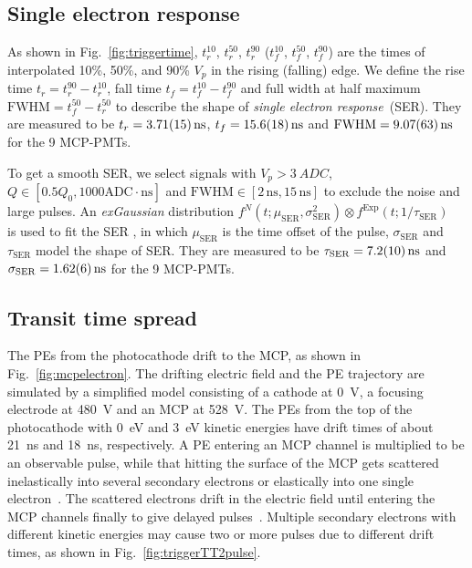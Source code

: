 \subsection{Single electron response}
\label{sec:SER}
As shown in Fig.~\ref{fig:triggertime}, $t^{10}_r$, $t^{50}_r$, $t^{90}_r$ ($t^{10}_f$, $t^{50}_f$, $t^{90}_f$) are the times of interpolated 10\%, 50\%, and 90\% $V_p$ in the rising (falling) edge. We define the rise time $t_r = t^{90}_r - t^{10}_r$, fall time $t_f = t^{10}_f - t^{90}_f$ and full width at half maximum $\mathrm{FWHM} = t^{50}_f - t^{50}_r$ to describe the shape of \emph{single electron response}~(SER).  They are measured to be $t_r = \SI{3.71\pm0.15}{ns}$, $t_f = \SI{15.6\pm1.8}{ns}$ and $\mathrm{FWHM} = \SI{9.07\pm0.63}{ns}$ for the 9 MCP-PMTs.

To get a smooth SER, we select signals with $V_p>\SI{3}{ADC}$, $Q \in [0.5Q_0, 1000\mathrm{ADC\cdot ns}]$ and $\mathrm{FWHM} \in [2\,\mathrm{ns}, 15\,\mathrm{ns}]$ to exclude the noise and large pulses. An \emph{exGaussian} distribution $f^N(t;\mu_{\mathrm{SER}},\sigma_\mathrm{SER}^2)\otimes f^{\mathrm{Exp}}(t;1/\tau_\mathrm{SER})$~\cite{Luo:2022xrd} is used to fit the SER%
, in which $\mu_{\mathrm{SER}}$ is the time offset of the pulse, $\sigma_{\mathrm{SER}}$ and $\tau_{\mathrm{SER}}$ model the shape of SER. They are measured to be $\tau_{\mathrm{SER}} = \SI{7.2\pm1.0}{ns}$ and $\sigma_{\mathrm{SER}} = \SI{1.62\pm0.06}{ns}$ for the 9 MCP-PMTs.

\subsection{Transit time spread}
\label{sec:TTS}
The PEs from the photocathode drift to the MCP, as shown in Fig.~\ref{fig:mcpelectron}. The drifting electric field and the PE trajectory are simulated by a simplified model consisting of a cathode at \SI{0}{V}, a focusing electrode at \SI{480}{V} and an MCP at \SI{528}{V}. The PEs from the top of the photocathode with \SI{0}{eV} and \SI{3}{eV} kinetic energies have drift times of about \SI{21}{ns} and \SI{18}{ns}, respectively. A PE entering an MCP channel is multiplied to be an observable pulse, while that hitting the surface of the MCP gets scattered inelastically into several secondary electrons or elastically into one single electron~\cite{Furman}. The scattered electrons drift in the electric field until entering the MCP channels finally to give delayed pulses~\cite{KM3NetTesting}. Multiple secondary electrons with different kinetic energies may cause two or more pulses due to different drift times, as shown in Fig.~\ref{fig:triggerTT2pulse}.

